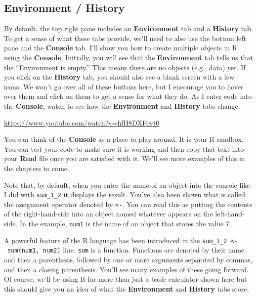\documentclass[]{tufte-book}
\begin{document}
\hypertarget{environment-history}{%
\subsection{Environment / History}\label{environment-history}}

By default, the top right pane includes an \textbf{Environment} tab and a \textbf{History} tab. To get a sense of what these tabs provide, we'll need to also use the bottom left pane and the \textbf{Console} tab. I'll show you how to create multiple objects in R using the \textbf{Console}. Initially, you will see that the \textbf{Environment} tab tells us that the ``Environment is empty.'' This means there are no objects (e.g., data) yet. If you click on the \textbf{History} tab, you should also see a blank screen with a few icons. We won't go over all of these buttons here, but I encourage you to hover over them and click on them to get a sense for what they do. As I enter code into the \textbf{Console}, watch to see how the \textbf{Environment} and \textbf{History} tabs change.

\vspace{0.1in}\begin{center}\footnotesize{\url{https://www.youtube.com/watch?v=hfH8DXFovt0}}\end{center}\vspace{0.1in}

You can think of the \textbf{Console} as a place to play around. It is your R sandbox. You can test your code to make sure it is working and then copy that text into your \textbf{Rmd} file once you are satisfied with it. We'll see more examples of this in the chapters to come.

Note that, by default, when you enter the name of an object into the console like I did with \texttt{sum\_1\_2} it displays the result. You've also been shown what is called the assignment operator denoted by \texttt{\textless{}-}. You can read this as putting the contents of the right-hand-side into an object named whatever appears on the left-hand-side. In the example, \texttt{num1} is the name of an object that stores the value 7.

A powerful feature of the R language has been introduced in the \texttt{sum\_1\_2\ \textless{}-\ sum(num1,\ num2)} line. \texttt{sum} is a function. Functions are denoted by their name and then a parenthesis, followed by one or more arguments separated by commas, and then a closing parenthesis. You'll see many examples of these going forward. Of course, we'll be using R for more than just a basic calculator shown here but this should give you an idea of what the \textbf{Environment} and \textbf{History} tabs store.
\end{document}
